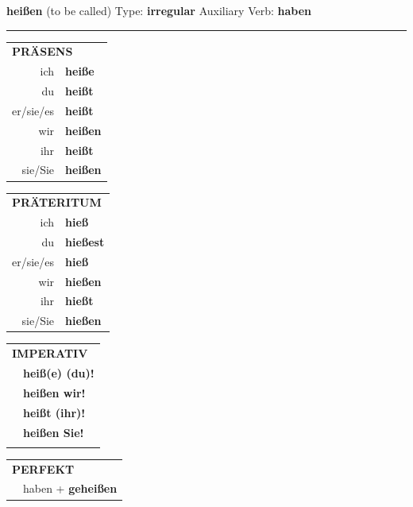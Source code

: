 \documentclass[10pt,a4paper]{revtex4-2}
\begin{document}
\begin{verbbox}
    {\Large \bf heißen} (to be called) \hfill Type: \textbf{irregular} \hfill Auxiliary Verb: \textbf{haben} 
    
     \vspace{5pt}

    \hrule
    
    \vspace{5pt}

  \begin{tabular}{rl}
     \multicolumn{2}{l}{\textbf{PRÄSENS} }\\
    ich & \textbf{heiße}\\
    du & \textbf{heißt}\\
    er/sie/es & \textbf{heißt}\\
    wir & \textbf{heißen}\\
    ihr & \textbf{heißt}\\
    sie/Sie & \textbf{heißen}\\
  \end{tabular}
  \hfill
     \begin{tabular}{rl}
    \multicolumn{2}{l}{\textbf{PRÄTERITUM} }\\
    ich & \textbf{hieß}\\
    du & \textbf{hießest}\\
    er/sie/es & \textbf{hieß}\\
    wir & \textbf{hießen}\\
    ihr & \textbf{hießt}\\
    sie/Sie & \textbf{hießen}\\
  \end{tabular}
  \hfill
  \begin{tabular}{rl}
     \multicolumn{2}{l}{\textbf{IMPERATIV} }\\
   & \textbf{heiß(e) (du)!}\\
   & \textbf{heißen wir!}\\
   & \textbf{heißt (ihr)!}\\
   & \textbf{heißen Sie!}\\
   & \vspace{10pt}
  \end{tabular}

    \vspace{10pt}

 \begin{tabular}{rl}
     \multicolumn{2}{l}{\textbf{PERFEKT}}\\
   & haben + \textbf{geheißen}\\
  \end{tabular}
\hfill
   \begin{tabular}{rl}
   

\end{tabular}
\end{verbbox}
\end{document}
